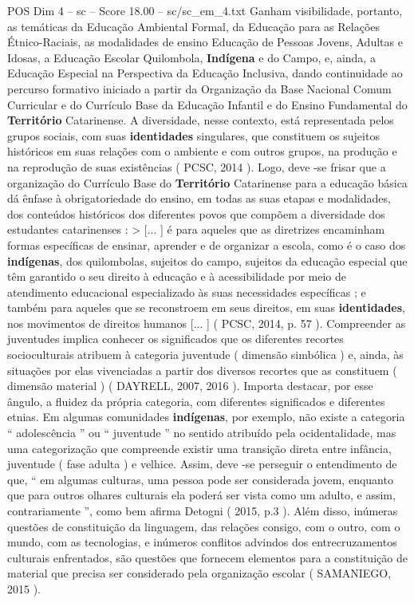 \begin{textsample}{POS Dim 4 – sc – Score 18.00 – sc/sc\_em\_4.txt}
Ganham visibilidade, portanto, as temáticas da Educação Ambiental Formal, da Educação para as Relações Étnico-Raciais, as modalidades de ensino Educação de Pessoas Jovens, Adultas e Idosas, a Educação Escolar Quilombola, \textbf{Indígena} e do Campo, e, ainda, a Educação Especial na Perspectiva da Educação Inclusiva, dando continuidade ao percurso formativo iniciado a partir da Organização da Base Nacional Comum Curricular e do Currículo Base da Educação Infantil e do Ensino Fundamental do \textbf{Território} Catarinense.
A diversidade, nesse contexto, está representada pelos grupos sociais, com suas \textbf{identidades} singulares, que constituem os sujeitos históricos em suas relações com o ambiente e com outros grupos, na produção e na reprodução de suas existências ( PCSC, 2014 ).
Logo, deve -se frisar que a organização do Currículo Base do \textbf{Território} Catarinense para a educação básica dá ênfase à obrigatoriedade do ensino, em todas as suas etapas e modalidades, dos conteúdos históricos dos diferentes povos que compõem a diversidade dos estudantes catarinenses : > [... ] é para aqueles que as diretrizes encaminham formas específicas de ensinar, aprender e de organizar a escola, como é o caso dos \textbf{indígenas}, dos quilombolas, sujeitos do campo, sujeitos da educação especial que têm garantido o seu direito à educação e à acessibilidade por meio de atendimento educacional especializado às suas necessidades específicas ; e também para aqueles que se reconstroem em seus direitos, em suas \textbf{identidades}, nos movimentos de direitos humanos [... ] ( PCSC, 2014, p. 57 ).
Compreender as juventudes implica conhecer os significados que os diferentes recortes socioculturais atribuem à categoria juventude ( dimensão simbólica ) e, ainda, às situações por elas vivenciadas a partir dos diversos recortes que as constituem ( dimensão material ) ( DAYRELL, 2007, 2016 ).
Importa destacar, por esse ângulo, a fluidez da própria categoria, com diferentes significados e diferentes etnias.
Em algumas comunidades \textbf{indígenas}, por exemplo, não existe a categoria “ adolescência ” ou “ juventude ” no sentido atribuído pela ocidentalidade, mas uma categorização que compreende existir uma transição direta entre infância, juventude ( fase adulta ) e velhice.
Assim, deve -se perseguir o entendimento de que, “ em algumas culturas, uma pessoa pode ser considerada jovem, enquanto que para outros olhares culturais ela poderá ser vista como um adulto, e assim, contrariamente ”, como bem afirma Detogni ( 2015, p.3 ).
Além disso, inúmeras questões de constituição da linguagem, das relações consigo, com o outro, com o mundo, com as tecnologias, e inúmeros conflitos advindos dos entrecruzamentos culturais enfrentados, são questões que fornecem elementos para a constituição de material que precisa ser considerado pela organização escolar ( SAMANIEGO, 2015 ).

\end{textsample}

